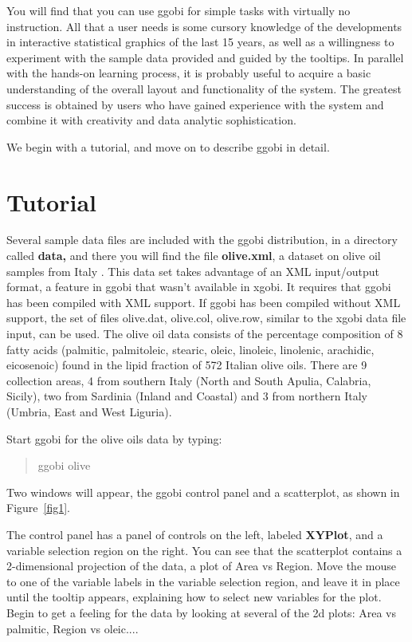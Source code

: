 \documentclass[11pt]{article}
\begin{document}
You will find that you can use ggobi for simple tasks with virtually
no instruction.  All that a user needs is some cursory knowledge of
the developments in interactive statistical graphics of the last 15
years, as well as a willingness to experiment with the sample data
provided and guided by the tooltips.  In parallel with the hands-on
learning process, it is probably useful to acquire a basic
understanding of the overall layout and functionality of the system.
The greatest success is obtained by users who have gained experience
with the system and combine it with creativity and data analytic
sophistication.

We begin with a tutorial, and move on to describe ggobi in detail.

\section{Tutorial}

Several sample data files are included with the ggobi distribution, in
a directory called {\bf data,} and there you will find the file {\bf
olive.xml}, a dataset on olive oil samples from Italy \cite{FALT83}.
This data set takes advantage of an XML input/output format, a feature
in ggobi that wasn't available in xgobi. It requires that ggobi has
been compiled with XML support. If ggobi has been compiled without XML
support, the set of files olive.dat, olive.col, olive.row, similar to
the xgobi data file input, can be used. The olive oil data consists of
the percentage composition of 8 fatty acids (palmitic, palmitoleic,
stearic, oleic, linoleic, linolenic, arachidic, eicosenoic) found in
the lipid fraction of 572 Italian olive oils. There are 9 collection
areas, 4 from southern Italy (North and South Apulia, Calabria,
Sicily), two from Sardinia (Inland and Coastal) and 3 from northern
Italy (Umbria, East and West Liguria).

Start ggobi for the olive oils data by typing:

\begin{quote}
ggobi olive
\end{quote}

Two windows will appear, the ggobi control panel and a scatterplot,
as shown in Figure~\ref{fig1}.

The control panel has a panel of controls on the left, labeled {\bf
XYPlot}, and a variable selection region on the right.  You can see
that the scatterplot contains a 2-dimensional projection of the data,
a plot of Area vs Region.  Move the mouse to one of the variable labels
in the variable selection region, and leave it in place until the
tooltip appears, explaining how to select new variables for the
plot.   Begin to get a feeling for the data by looking at several of
the 2d plots:  Area vs palmitic, Region vs oleic....
\end{document}

